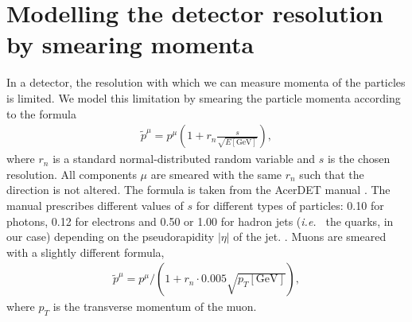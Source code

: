 \documentclass[twoside,english]{uiofysmaster}
\begin{document}
\section{Modelling the detector resolution by smearing momenta}
In a detector, the resolution with which we can measure momenta of the particles is limited. We model this limitation by smearing the particle momenta according to the formula 
\begin{align}
	\tilde{p}^\mu = p^\mu \left( 1 + r_n \frac{s}{\sqrt{E \mathrm{[GeV]}}} \right),\label{eq:smear1}
\end{align}
where $r_n$ is a standard normal-distributed random variable and $s$ is the chosen resolution. All components $\mu$ are smeared with the same $r_n$ such that the direction is not altered. The formula is taken from the {\ttfamily AcerDET} manual \cite{RichterWas:2002ch}. The manual prescribes different values of $s$ for different types of particles: 0.10 for photons, 0.12 for electrons and 0.50 or 1.00 for hadron jets ({\it i.e.\ } the quarks, in our case) depending on the pseudorapidity $|\eta|$ of the jet. . Muons are smeared with a slightly different formula,
\begin{align}
	\tilde{p}^\mu = p^\mu / \left( 1 + r_n \cdot 0.005{\sqrt{p_T \mathrm{[GeV]}}} \right),\label{eq:smear2}
\end{align}
 where $p_T$ is the transverse momentum of the muon.

\end{document}
